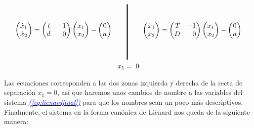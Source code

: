 \documentclass[12pt,a4paper]{report} %
\newcommand{\eref}[1]{\hyperref[#1]{\textcolor{blue}{\textit{(\ref*{#1})}}}}
\begin{document}
	\begin{equation}
		\label{eq:lienardfinalgr}
		\begin{gathered}
			\begin{pmatrix*}[r]
				\dot{x}_1\\ \dot{x}_2
			\end{pmatrix*}= \begin{pmatrix*}[r]
				t & -1 \\ d & 0
			\end{pmatrix*} \begin{pmatrix*}[r]
				x_1 \\ x_2
			\end{pmatrix*}-\begin{pmatrix*}[c]
				0 \\ a
			\end{pmatrix*} \qquad 
			\rule[-40pt]{1.5pt}{80pt} \qquad 
			\begin{pmatrix*}[r]
				\dot{x}_1\\ \dot{x}_2
			\end{pmatrix*}= \begin{pmatrix*}[r]
				T & -1 \\ D & 0
			\end{pmatrix*} \begin{pmatrix*}[r]
				x_1 \\ x_2
			\end{pmatrix*}-\begin{pmatrix*}[c]
				0 \\ a
			\end{pmatrix*} \\ x_1=\;0
		\end{gathered}
	\end{equation}\smallskip
	
	\newpage
	
	\noindent Las ecuaciones corresponden a las dos zonas izquierda y derecha de la recta de separación $x_1=0$, así que haremos unos cambios de nombre a las variables del sistema \eref{eq:lienardfinal} para que los nombres sean un poco más descriptivos. Finalmente, el sistema en la forma canónica de Liènard nos queda de la siguiente manera:
	
\end{document}
